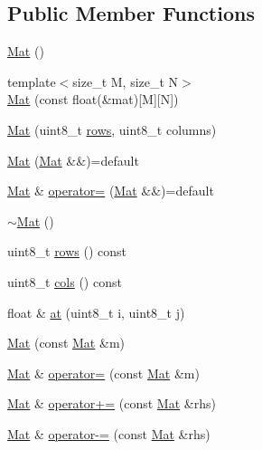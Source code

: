 \subsection*{Public Member Functions}
\begin{DoxyCompactItemize}
\item 
\mbox{\hyperlink{class_mat_a7205342eec3270c1aa954f35d8af27c7}{Mat}} ()
\item 
{\footnotesize template$<$size\+\_\+t M, size\+\_\+t N$>$ }\\\mbox{\hyperlink{class_mat_af844a885aedf39d90ad27b2f34333791}{Mat}} (const float(\&mat)\mbox{[}M\mbox{]}\mbox{[}N\mbox{]})
\item 
\mbox{\hyperlink{class_mat_a591f4755584ae81e04f14e8f780a05f8}{Mat}} (uint8\+\_\+t \mbox{\hyperlink{class_mat_a5b965c2e37939da2aea0af686209655c}{rows}}, uint8\+\_\+t columns)
\item 
\mbox{\hyperlink{class_mat_a560a2b152f0b4c7389058c23668da819}{Mat}} (\mbox{\hyperlink{class_mat}{Mat}} \&\&)=default
\item 
\mbox{\hyperlink{class_mat}{Mat}} \& \mbox{\hyperlink{class_mat_aa0e4a30b4d5a71e6c3cc780fabeca136}{operator=}} (\mbox{\hyperlink{class_mat}{Mat}} \&\&)=default
\item 
\mbox{\hyperlink{class_mat_a87836525bb8e60bda57d246b7370b97e}{$\sim$\+Mat}} ()
\item 
uint8\+\_\+t \mbox{\hyperlink{class_mat_a5b965c2e37939da2aea0af686209655c}{rows}} () const
\item 
uint8\+\_\+t \mbox{\hyperlink{class_mat_a88332d9cd088208e24bea1f10651d1e7}{cols}} () const
\item 
float \& \mbox{\hyperlink{class_mat_a5f4b8f7e3c55a1caf7161c11ec2a2465}{at}} (uint8\+\_\+t i, uint8\+\_\+t j)
\item 
\mbox{\hyperlink{class_mat_a1e30e252a1e556ac5e131edac7b08a23}{Mat}} (const \mbox{\hyperlink{class_mat}{Mat}} \&m)
\item 
\mbox{\hyperlink{class_mat}{Mat}} \& \mbox{\hyperlink{class_mat_ae66f73e282cd9134c4677b33f964c575}{operator=}} (const \mbox{\hyperlink{class_mat}{Mat}} \&m)
\item 
\mbox{\hyperlink{class_mat}{Mat}} \& \mbox{\hyperlink{class_mat_a649fa81760478538ff4db14b9572fd81}{operator+=}} (const \mbox{\hyperlink{class_mat}{Mat}} \&rhs)
\item 
\mbox{\hyperlink{class_mat}{Mat}} \& \mbox{\hyperlink{class_mat_a2bb1e2bbfba19148a87b67288ed7fc91}{operator-\/=}} (const \mbox{\hyperlink{class_mat}{Mat}} \&rhs)
\item 

\end{DoxyCompactItemize}
